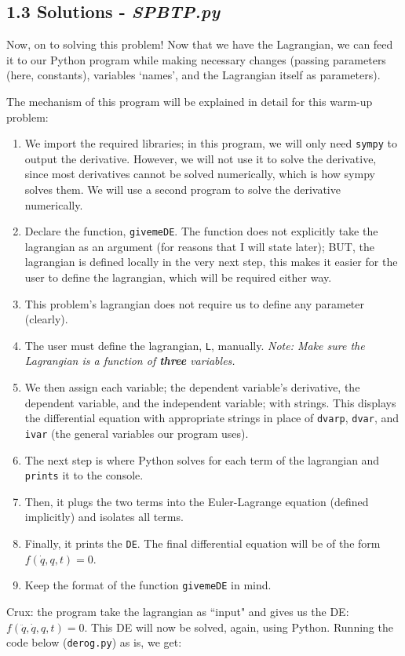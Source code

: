 \documentclass[hidelinks, 11pt]{article}
\begin{document}
\subsection*{1.3 Solutions - \emph{SPBTP.py}}
Now, on to solving this problem! Now that we have the Lagrangian, we can feed it to our Python program while making necessary changes (passing parameters (here, constants), variables `names', and the Lagrangian itself as parameters).

\noindent The mechanism of this program will be explained in detail for this warm-up problem:
\newline

\begin{changemargin}{2cm}{2cm}
  \begin{enumerate}
    \item We import the required libraries; in this program, we will only need \verb|sympy| to output the derivative. However, we will not use it to solve the derivative, since most derivatives cannot be solved numerically, which is how sympy solves them. We will use a second program to solve the derivative numerically.
    \item Declare the function, \verb|givemeDE|. The function does not explicitly take the lagrangian as an argument (for reasons that I will state later); BUT, the lagrangian is defined locally in the very next step, this makes it easier for the user to define the lagrangian, which will be required either way.
    \item This problem's lagrangian does not require us to define any parameter (clearly).
    \item The user must define the lagrangian, \verb|L|, manually.
    \newline
    \textit{Note: Make sure the Lagrangian is a function of \textbf{three} variables.}
    \item We then assign each variable; the dependent variable's derivative, the dependent variable, and the independent variable; with strings. This displays the differential equation with appropriate strings in place of \verb|dvarp|, \verb|dvar|, and \verb|ivar| (the general variables our program uses).
    \item The next step is where Python solves for each term of the lagrangian and \verb|prints| it to the console. 
    \item Then, it plugs the two terms into the Euler-Lagrange equation (defined implicitly) and isolates all terms.
    \item Finally, it prints the \verb|DE|. The final differential equation will be of the form $f(\dot{q}, q, t) = 0$.
    \item Keep the format of the function \verb|givemeDE| in mind.
  \end{enumerate}
\end{changemargin}
Crux: the program take the lagrangian as ``input" and gives us the DE: $f(\ddot{q}, \dot{q}, q, t) = 0$. This DE will now be solved, again, using Python. Running the code below (\verb|derog.py|) as is, we get:
\end{document}
